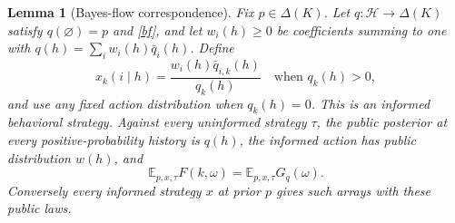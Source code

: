 \documentclass[11pt,a4paper]{article}
\newtheorem{lemma}[theorem]{Lemma}
\theoremstyle{definition}
\theoremstyle{remark}
\newcommand{\E}{\mathbb E}
\newcommand{\HH}{\mathcal H}
\begin{document}
\begin{lemma}[Bayes-flow correspondence]\label{bayes}
Fix $p\in\Delta(K)$. Let $q:\HH\to\Delta(K)$ satisfy
$q(\varnothing)=p$ and \eqref{bf}, and let $w_i(h)\geq0$ be coefficients summing
to one with $q(h)=\sum_i w_i(h)\bar q_i(h)$. Define
\[
 x_k(i\mid h)=\frac{w_i(h)\bar q_{i,k}(h)}{q_k(h)}
 \quad\text{when }q_k(h)>0,
\]
and use any fixed action distribution when $q_k(h)=0$. This is an
informed behavioral strategy. Against every uninformed strategy $\tau$,
the public posterior at every positive-probability history is $q(h)$,
the informed action has public distribution $w(h)$, and
\begin{equation}
 \E_{p,x,\tau}F(k,\omega)=\E_{p,x,\tau}G_q(\omega).
 \tag{PI}\label{pi}
\end{equation}
Conversely every informed strategy $x$ at prior $p$ gives such arrays
with these public laws.
\end{lemma}
\end{document}
